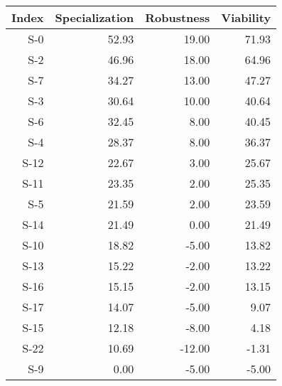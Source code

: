 

\begin{tabular}{ | r | r | r | r | }
    \hline
                 Index  &  Specialization  &      Robustness  &       Viability  \\
    \hline
    \hline
                   S-0  &           52.93  &           19.00  &           71.93  \\
    \hline
                   S-2  &           46.96  &           18.00  &           64.96  \\
    \hline
                   S-7  &           34.27  &           13.00  &           47.27  \\
    \hline
                   S-3  &           30.64  &           10.00  &           40.64  \\
    \hline
                   S-6  &           32.45  &            8.00  &           40.45  \\
    \hline
                   S-4  &           28.37  &            8.00  &           36.37  \\
    \hline
                  S-12  &           22.67  &            3.00  &           25.67  \\
    \hline
                  S-11  &           23.35  &            2.00  &           25.35  \\
    \hline
                   S-5  &           21.59  &            2.00  &           23.59  \\
    \hline
                  S-14  &           21.49  &            0.00  &           21.49  \\
    \hline
                  S-10  &           18.82  &           -5.00  &           13.82  \\
    \hline
                  S-13  &           15.22  &           -2.00  &           13.22  \\
    \hline
                  S-16  &           15.15  &           -2.00  &           13.15  \\
    \hline
                  S-17  &           14.07  &           -5.00  &            9.07  \\
    \hline
                  S-15  &           12.18  &           -8.00  &            4.18  \\
    \hline
                  S-22  &           10.69  &          -12.00  &           -1.31  \\
    \hline
                   S-9  &            0.00  &           -5.00  &           -5.00  \\

\end{tabular}
